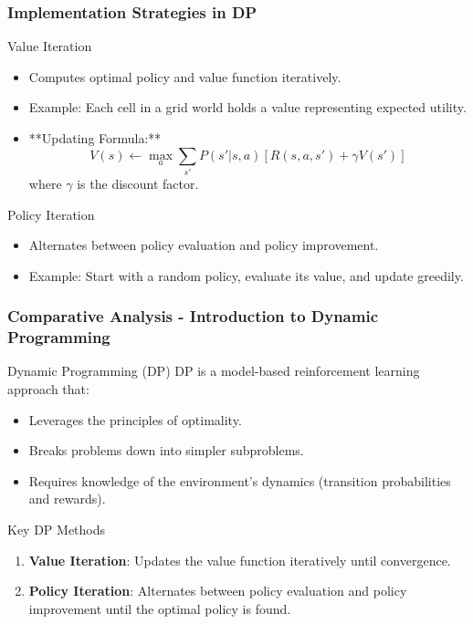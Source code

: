 \documentclass[aspectratio=169]{beamer}
\begin{document}
\begin{frame}[fragile]
    \frametitle{Implementation Strategies in DP}
    \begin{block}{Value Iteration}
        \begin{itemize}
            \item Computes optimal policy and value function iteratively.
            \item Example: Each cell in a grid world holds a value representing expected utility.
            \item **Updating Formula:**
            \begin{equation}
                V(s) \leftarrow \max_a \sum_{s'} P(s'|s,a) [R(s,a,s') + \gamma V(s')]
            \end{equation}
            where $\gamma$ is the discount factor.
        \end{itemize}
    \end{block}
    
    \begin{block}{Policy Iteration}
        \begin{itemize}
            \item Alternates between policy evaluation and policy improvement.
            \item Example: Start with a random policy, evaluate its value, and update greedily.
        \end{itemize}
    \end{block}
\end{frame}

\begin{frame}[fragile]
  \frametitle{Comparative Analysis - Introduction to Dynamic Programming}
  \begin{block}{Dynamic Programming (DP)}
      DP is a model-based reinforcement learning approach that:
      \begin{itemize}
          \item Leverages the principles of optimality.
          \item Breaks problems down into simpler subproblems.
          \item Requires knowledge of the environment's dynamics (transition probabilities and rewards).  
      \end{itemize}
  \end{block}

  \begin{block}{Key DP Methods}
      \begin{enumerate}
          \item \textbf{Value Iteration}: Updates the value function iteratively until convergence.
          \item \textbf{Policy Iteration}: Alternates between policy evaluation and policy improvement until the optimal policy is found.
      \end{enumerate}
  \end{block}
\end{frame}
\end{document}
